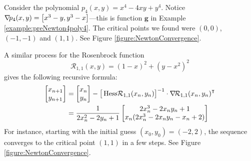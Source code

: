 \begin{example}\label{example:NewtonPoly4}
Consider the polynomial $p_4(x,y) = x^4-4xy+y^4$. Notice $\mathop{\nabla\! {p_4}}(x,y) = \big[ x^3-y, y^3-x \big]$---this is function $\boldsymbol{g}$ in Example \ref{example:preNewton4poly4}.  The critical points we found were $(0,0)$, $(-1,-1)$ and $(1,1)$.  See Figure \ref{figure:NewtonConvergence}.
\end{example}
\begin{example}
A similar process for the Rosenbrock function
\begin{equation*}
\mathcal{R}_{1,1}(x,y) = (1-x)^2 + (y-x^2)^2
\end{equation*}
gives the following recursive formula:
\begin{align*}
\begin{bmatrix} x_{n+1} \\ y_{n+1} \end{bmatrix} &=
\begin{bmatrix} x_{n} \\ y_{n} \end{bmatrix} - \big[ \mathop{\mathrm{Hess}{\mathcal{R}_{1,1}}}(x_n,y_n) \big]^{-1} \cdot {\mathop{\nabla\! {\mathcal{R}_{1,1}}}(x_n, y_n)}^\intercal \\
&= \frac{1}{2x_n^2-2y_n+1} \begin{bmatrix}
2x_n^3-2x_n y_n+1 \\ x_n(2x_n^3-2x_n y_n-x_n+2)
\end{bmatrix}
\end{align*}
For instance, starting with the initial guess $(x_0, y_0) = (-2,2)$, the sequence converges to the critical point $(1,1)$ in a few steps.  See Figure \ref{figure:NewtonConvergence}.
\end{example}
